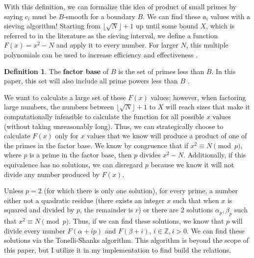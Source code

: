 \documentclass[11pt,reqno]{amsart}
\theoremstyle{definition}
\newtheorem{definition}[theorem]{Definition}
\begin{document}
With this definition, we can formalize this idea of product of small primes by saying $c_i$ must be $B$-smooth for a boundary $B$. We can find these $a_i$ values with a sieving algorithm! Starting from $\lfloor \sqrt{N} \rfloor + 1$ up until some bound $X$, which is referred to in the literature as the sieving interval, we define a function $F(x) = x^2 - N$ and apply it to every number. For larger $N$, this multiple polynomials can be used to increase efficiency and effectiveness \cite{silverman1987multiple}.

\begin{definition}
   The \textbf{factor base} of $B$ is the set of primes less than $B$. In this paper, this set will also include all prime powers less than $B$ \cite{silverman2008introduction}.
\end{definition}

We want to calculate a large set of these $F(x)$ values; however, when factoring large numbers, the numbers between $\lfloor \sqrt{N} \rfloor + 1$ to $X$ will reach sizes that make it computationally infeasible to calculate the function for all possible $x$ values (without taking unreasonably long). Thus, we can strategically choose to calculate $F(x)$ only for $x$ values that we know will produce a product of one of the primes in the factor base. We know by congruence that if $x^2 \equiv N \pmod{p}$, where $p$ is a prime in the factor base, then $p$ divides $x^2 - N$. Additionally, if this equivalence has no solutions, we can disregard $p$ because we know it will not divide any number produced by $F(x)$.

Unless $p = 2$ (for which there is only one solution), for every prime, a number either not a quadratic residue (there exists an integer $x$ such that when $x$ is squared and divided by $p$, the remainder is $r$) or there are 2 solutions $\alpha_p, \beta_p$ such that $x^2 \equiv N \pmod{p}$. Thus, if we can find these solutions, we know that $p$ will divide every number $F(\alpha + ip)$ and $F(\beta + i)$, $i \in \mathbb{Z}, i > 0$. We can find these solutions via the Tonelli-Shanks algorithm. This algorithm is beyond the scope of this paper, but I utilize it in my implementation to find build the relations.

\end{document}
